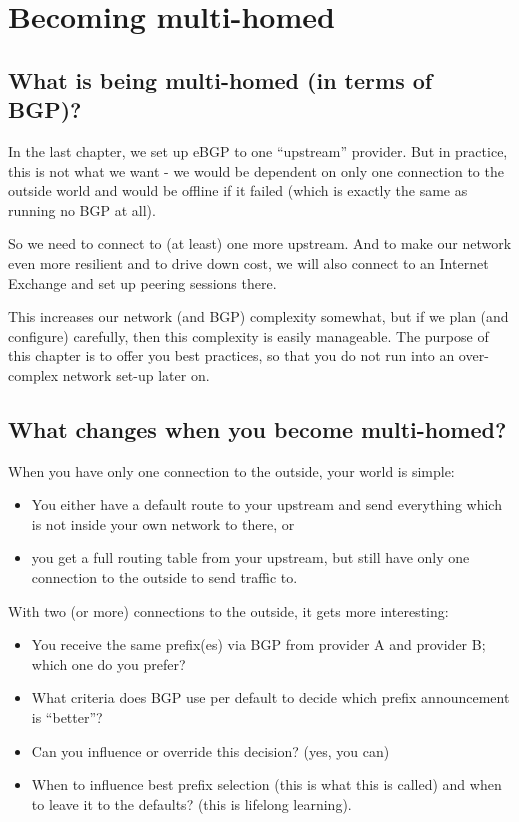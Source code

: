 \chapter{Becoming multi-homed}
\section{What is being multi-homed (in terms of BGP)?}
In the last chapter, we set up eBGP to one ``upstream'' provider. But in practice, this is not what we want - we would be dependent on only one connection to the outside world and would be offline if it failed (which is exactly the same as running no BGP at all).

So we need to connect to (at least) one more upstream. And to make our network even more resilient and to drive down cost, we will also connect to an Internet Exchange and set up peering sessions there.

This increases our network (and BGP) complexity somewhat, but if we plan (and configure) carefully, then this complexity is easily manageable. The purpose of this chapter is to offer you best practices, so that you do not run into an over-complex network set-up later on.

\section{What changes when you become multi-homed?}
When you have only one connection to the outside, your world is simple:
\begin{itemize}
  \item You either have a default route to your upstream and send everything which is not inside your own network to there, or
  \item you get a full routing table from your upstream, but still have only one connection to the outside to send traffic to.
\end{itemize}

With two (or more) connections to the outside, it gets more interesting:
\begin{itemize}
  \item You receive the same prefix(es) via BGP from provider A and provider B; which one do you prefer?
  \item What criteria does BGP use per default to decide which prefix announcement is ``better''?
  \item Can you influence or override this decision? (yes, you can)
  \item When to influence best prefix selection (this is what this is called) and when to leave it to the defaults? (this is lifelong learning).
\end{itemize}


